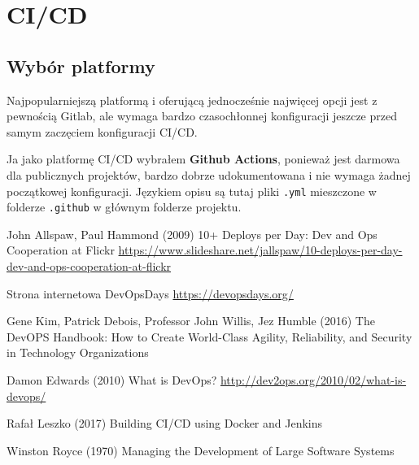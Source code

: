 \documentclass{article}
\begin{document}
\section{CI/CD}

\subsection{Wybór platformy}

Najpopularniejszą platformą i oferującą jednocześnie najwięcej opcji jest z pewnością Gitlab, ale wymaga bardzo czasochłonnej konfiguracji jeszcze przed samym zaczęciem konfiguracji CI/CD.

Ja jako platformę CI/CD wybrałem \textbf{Github Actions}, ponieważ jest darmowa dla publicznych projektów, bardzo dobrze udokumentowana i nie wymaga żadnej początkowej konfiguracji. Językiem opisu są tutaj pliki \lstinline|.yml| mieszczone w folderze \lstinline|.github| w głównym folderze projektu.

\begin{thebibliography}{9}

John Allspaw, Paul Hammond (2009) 10+ Deploys per Day: Dev and Ops Cooperation at Flickr \url{https://www.slideshare.net/jallspaw/10-deploys-per-day-dev-and-ops-cooperation-at-flickr}

Strona internetowa DevOpsDays \url{https://devopsdays.org/}

Gene Kim, Patrick Debois, Professor John Willis, Jez Humble (2016) The DevOPS Handbook: How to Create World-Class Agility, Reliability, and Security in Technology Organizations

Damon Edwards (2010) What is DevOps? \url{http://dev2ops.org/2010/02/what-is-devops/}

Rafał Leszko (2017) Building CI/CD using Docker and Jenkins

Winston Royce (1970) Managing the Development of Large Software Systems

\end{thebibliography}
\end{document}

